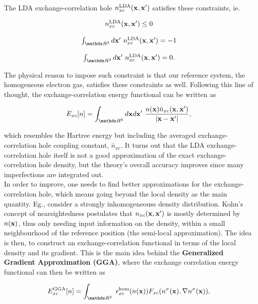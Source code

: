 \documentclass{homework}
\begin{document}
The LDA exchange-correlation hole $n_{xc}^{\textnormal{LDA}}({\bf x},{\bf x}')$ satisfies these constraints, ie.

$$
\begin{array}{c}
     n_{xc}^{\textnormal{LDA}}(\x,\x') \leq 0  \\
     \blanky \\
     \int_{\R^{3}} d\x' \blanky n_{xc}^{\textnormal{LDA}}(\x,\x') = -1\\
     \blanky \\
     \int_{\R^{3}} d\x' \blanky n_{xc}^{\textnormal{LDA}}(\x,\x') = 0.
\end{array}
$$

The physical reason to impose such constraint is that our reference system, the homogeneous electron gas, satisfies these constraints as well. Following this line of thought, the exchange-correlation energy functional can be written as 

\begin{equation}
    E_{xc} [n] = \int_{\R^6} d\x d\x' \blanky \frac{n(\x) \bar{n}_{xc}(\x, \x')}{|\x - \x'|},
    \label{exchange-correlation energy}
\end{equation}

which resembles the Hartree energy but including the averaged exchange-correlation hole coupling constant, $\bar n_{xc}$. It turns out that the LDA exchange-correlation hole itself is not a good approximation of the exact exchange-correlation hole density, but the theory's overall accuracy improves since many imperfections are integrated out. \\


In order to improve, one needs to find better approximations for the exchange-correlation hole, which means going beyond the local density as the main quantity. Eg., consider a strongly inhomogeneouss density distribution. Kohn's concept of nearsightedness postulates that $n_{xc}({\bf x}, {\bf x}')$ is mostly determined by $n({\bf x})$, thus only needing input information on the density, within a small neighbourhood of the reference position (the semi-local approximation). The idea is then, to construct an exchange-correlation functional in terms of the local density and its gradient. This is the main idea behind the \textbf{Generalized Gradient Approximation (GGA)}, where the exchange correlation energy functional can then be written as 


\begin{equation}
    E_{xc}^{\textnormal{GGA}}[n] = \int_{\R^3} \blanky \epsilon_{xc}^{\textnormal{hom}}(n(\x)) F_{xc} (n^{\sigma}(\x), \nabla n^{\sigma}(\x)),
\end{equation}
\end{document}
